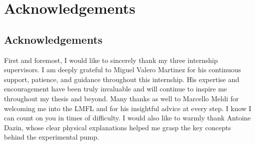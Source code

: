 \chapter*{Acknowledgements}


\vspace{0.5cm}






\section*{Acknowledgements}


First and foremost, I would like to sincerely thank my three internship supervisors.  
I am deeply grateful to Miguel Valero Martinez for his continuous support, patience, and guidance throughout this internship. His expertise and encouragement have been truly invaluable and will continue to inspire me throughout my thesis and beyond.  
Many thanks as well to Marcello Meldi for welcoming me into the LMFL and for his insightful advice at every step. I know I can count on you in times of difficulty.
I would also like to warmly thank Antoine Dazin, whose clear physical explanations helped me grasp the key concepts behind the experimental pump.

